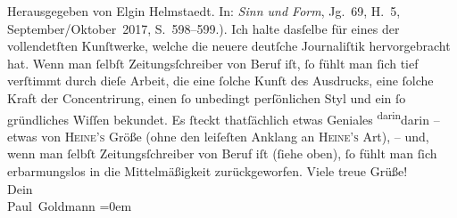 \begin{ledgroupsized}[t]{13cm}
{{{                     Herausgegeben von Elgin Helmstaedt. In: \emph{Sinn und Form},
                     Jg. 69, H. 5, September/Oktober 2017, S. 598–599.)}}}\label{K_L02899-1h}.
               Ich halte dasſelbe für eines der vollendetſten Kunſtwerke, welche die neuere deutſche Journaliſtik
               hervorgebracht hat. Wenn man ſelbſt Zeitungsſchreiber von Beruf iſt, ſo fühlt man
               ſich tief verſtimmt durch  dieſe Arbeit, die eine ſolche Kunſt
               des Ausdrucks, eine ſolche Kraft der Concentrirung, einen ſo unbedingt perſönlichen
               Styl und ein ſo gründliches Wiſſen bekundet. Es ſteckt thatſächlich etwas Geniales \substVorne{}\textsuperscript{darin}\substDazwischen{}darin\substHinten{} – {\pb}etwas von \textsc{Heine’s} Größe (ohne den leiſeſten
               Anklang an \textsc{Heine’s} Art), – und, wenn man ſelbſt
               Zeitungsſchreiber von Beruf iſt (ſiehe oben), ſo fühlt man ſich erbarmungslos in die
               Mittelmäßigkeit zurückgeworfen.\pend
           \pstart
           Viele treue Grüße! {\\[\baselineskip]}Dein {\\[\baselineskip]}\spacefill\mbox{Paul Goldmann}\pend
           \leftskip=0em{}
         
         \endnumbering{}\end{ledgroupsized}  \newcommand{\dateiname}{L02899}\newcommand{\titel}{Paul Goldmann an Arthur Schnitzler, 13. 12. [1899]}\newcommand{\editorInnen}{Martin Anton Müller und Laura Untner}
      